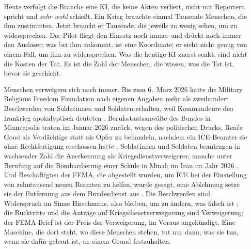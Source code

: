 Heute verfolgt die Branche eine KI, die keine Akten verliert, nicht mit Reportern spricht und \emph{sehr wohl} schießt. Ein Krieg brauchte einmal Tausende Menschen, die ihm zustimmten. Jetzt braucht er Tausende, die jeweils zu wenig sehen, um zu widersprechen. Der Pilot fliegt den Einsatz noch immer und drückt noch immer den Auslöser; was bei ihm ankommt, ist eine Koordinate; er sieht nicht genug von einem Fall, um ihm zu widersprechen. Was die heutige KI zuerst senkt, sind nicht die Kosten der Tat. Es ist die Zahl der Menschen, die wissen, was die Tat ist, bevor sie geschieht.

Menschen verweigern sich noch immer. Bis zum 6.~März 2026 hatte die Military Religious Freedom Foundation nach eigenen Angaben mehr als zweihundert Beschwerden von Soldatinnen und Soldaten erhalten, weil Kommandeure den Irankrieg apokalyptisch deuteten \autocite{Snopes2026MRFF}. Berufsstaatsanwälte des Bundes in Minneapolis traten im Januar 2026 zurück, wegen des politischen Drucks, Renée Good als Verdächtige statt als Opfer zu behandeln, nachdem ein ICE-Beamter sie ohne Rechtfertigung erschossen hatte \autocite{Kaplan2026MinnProsecutors,CBS2026MinnFraudProsecutors,Wikipedia2026ReneeGood}. Soldatinnen und Soldaten beantragen in wachsender Zahl die Anerkennung als Kriegsdienstverweigerer, manche unter Berufung auf die Bombardierung einer Schule in Minab im Iran im Jahr 2026 \autocite{Sridhar2026CO}. Und Beschäftigten der FEMA, die abgestellt wurden, um ICE bei der Einstellung von zehntausend neuen Beamten zu helfen, wurde gesagt, eine Ablehnung setze sie der Entfernung aus dem Bundesdienst aus \autocite{Dayen2025FEMAICE,Stanton2026FEMALetter}. Die Beschwerden sind Widerspruch im Sinne Hirschmans, also bleiben, um zu ändern, was falsch ist \autocite{hirschman1970exit}; die Rücktritte und die Anträge auf Kriegsdienstverweigerung sind Verweigerung; der FEMA-Brief ist der Preis der Verweigerung, im Voraus angekündigt. Eine Maschine, die dort steht, wo diese Menschen stehen, tut nur dann, was sie tun, wenn sie dafür gebaut ist, an einem Grund festzuhalten.


